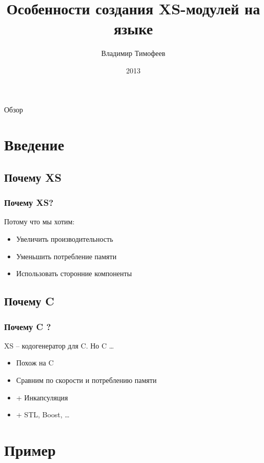 \documentclass[pdflatex,hyperref={unicode=true}]{beamer}
\title{Особенности создания XS-модулей на языке \cpp}
\author{Владимир Тимофеев}
\date{2013}
\DeclareRobustCommand{\cpp}{
    \texorpdfstring{\hbox{C\hspace{-0.5ex}\protect\raisebox{0.5ex}{\protect\scalebox{0.67}{++}}}}{C++}
}
\begin{document}
\begin{frame}
    \titlepage
\end{frame}

\begin{frame}{Обзор}
    \tableofcontents
\end{frame}

\section{Введение}

\subsection{Почему XS}

\begin{frame}
    \frametitle{Почему XS?}
    Потому что мы хотим:
    \begin{itemize}[<+->]
        \item Увеличить производительность
        \item Уменьшить потребление памяти
        \item Использовать сторонние компоненты
    \end{itemize}
\end{frame}

\subsection{Почему \cpp}

\begin{frame}
    \frametitle{Почему \cpp?}
    XS -- кодогенератор для C. Но \cpp\ldots
    \begin{itemize}[<+->]
        \item Похож на C
        \item Сравним по скорости и потреблению памяти
        \item + Инкапсуляция
        \item + STL, Boost, \dots
    \end{itemize}
\end{frame}

\section{Пример}
\end{document}
